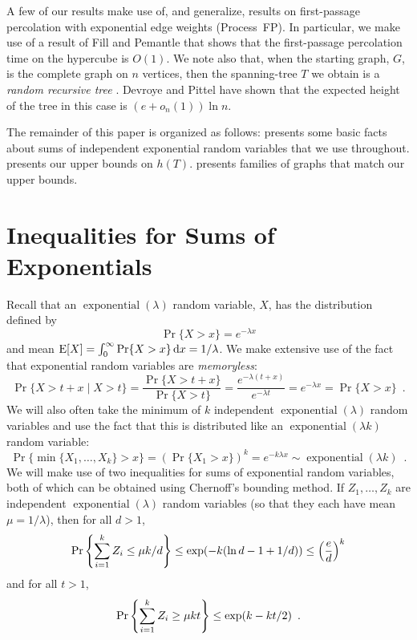 \documentclass[lotsofwhite]{patmorin}
\DeclareMathOperator{\exponential}{exponential}
\begin{document}
A few of our results make use of, and generalize, results on first-passage
percolation with exponential edge weights (Process~FP).  In particular,
we make use of a result of Fill and Pemantle that shows that the
first-passage percolation time on the hypercube is $O(1)$.
We note also that, when the starting graph, $G$, is the complete graph
on $n$ vertices, then the spanning-tree $T$ we obtain is a \emph{random
recursive tree} \cite{X}.  Devroye \cite{devroye} and Pittel \cite{pittle}
have shown that the expected height of the tree in this case is
$(e+o_n(1))\ln n$.

The remainder of this paper is organized as follows:
 presents some basic facts about sums of
independent exponential random variables that we use throughout.
 presents our upper bounds on $h(T)$.
 presents families of graphs that match our upper
bounds.

\section{Inequalities for Sums of Exponentials}

Recall that an $\exponential(\lambda)$ random variable, $X$, has the
distribution defined by
\[
   \Pr\{X>x\} = e^{-\lambda x} 
\]
and mean $\mathrm{E}[X] = \int_0^{\infty} \Pr\{X>x\}\,\mathrm{d}x = 1/\lambda$.  
We make extensive use of the fact that exponential random variables are
\emph{memoryless}:
\[
    \Pr\{X > t+x\mid X>t\} = \frac{\Pr\{X> t+x\}}{\Pr\{X > t\}}
           = \frac{e^{-\lambda(t+x)}}{e^{-\lambda t}} = e^{-\lambda x} = \Pr\{X > x\} \enspace .
\]
We will also often take the minimum of $k$ independent $\exponential(\lambda)$ random variables and use the fact that this is distributed like an
$\exponential(\lambda k)$ random variable:
\[
   \Pr\{\min\{X_1,\ldots,X_k\} > x\} 
      = (\Pr\{X_1 > x\})^{k}
      = e^{-k\lambda x} \sim \exponential(\lambda k) \enspace .
\]
We will make use of two inequalities for sums of exponential random
variables, both of which can be obtained using Chernoff's bounding
method.  If $Z_1,\ldots,Z_k$ are independent $\exponential(\lambda)$
random variables (so that they each have mean $\mu=1/\lambda$), then
for all $d>1$,
\begin{equation}
    \Pr\left\{\sum_{i=1}^k Z_i \le \mu k/d\right\} \le \exp(-k(\ln d -1 + 1/d)) \le \left(\frac{e}{d}\right)^k  \eqlabel{head-bound}
\end{equation}
and for all $t>1$, 
\begin{equation}
    \Pr\left\{\sum_{i=1}^k Z_i \ge \mu k t\right\} \le \exp (k-kt/2) \enspace . \eqlabel{tail-bound}
\end{equation}
\end{document}
